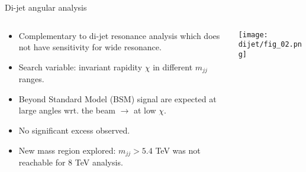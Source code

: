 \documentclass[8pt]{beamer}
\begin{document}
\begin{frame}{\large Di-jet angular analysis}
 \begin{columns}
 \begin{column}{6cm}
    \begin{itemize}
      \item Complementary to di-jet resonance analysis which does not have sensitivity for wide resonance.
      \vspace{0.2cm}
      \item Search variable: invariant rapidity $\chi$ in different $m_{jj}$ ranges.
      \vspace{1.5cm}
      \item Beyond Standard Model (BSM) signal are expected at large angles wrt. the beam $\rightarrow$ at low $\chi$.
      \vspace{0.2cm}
      \item No significant excess observed.
      \vspace{0.2cm}
      \item New mass region explored: $m_{jj}>5.4$ TeV was not reachable for 8 TeV analysis.
    \end{itemize}
    \vspace{1.7cm}
    
 \end{column}
 \begin{column}{6cm}
  \texttt{[image: dijet/fig\_02.png]}\\
 \end{column}
\end{columns}
\end{frame}
\end{document}
